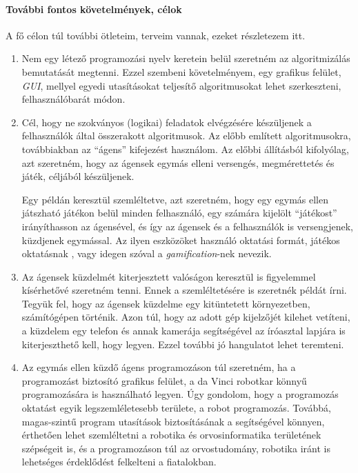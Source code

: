 \documentclass[12pt,a4paper,oneside]{report} %
\begin{document}
\paragraph*{További fontos követelmények, célok}
A fő célon túl további ötleteim, terveim vannak, ezeket részletezem itt.
\begin{enumerate}
	\item Nem egy létező programozási nyelv keretein belül szeretném  az algoritmizálás bemutatását megtenni. Ezzel szembeni követelményem, egy grafikus felület, \textit{GUI}, mellyel egyedi utasításokat teljesítő algoritmusokat lehet szerkeszteni, felhasználóbarát módon.
	\item Cél, hogy ne szokványos (logikai) feladatok elvégzésére készüljenek a felhasználók által összerakott algoritmusok. Az előbb említett algoritmusokra, továbbiakban az ``ágens'' kifejezést használom. Az előbbi állításból kifolyólag, azt szeretném, hogy az ágensek  egymás elleni versengés, megmérettetés és játék, céljából készüljenek.
	\par Egy példán keresztül szemléltetve, azt szeretném, hogy egy egymás ellen játszható játékon belül minden felhasználó, egy számára kijelölt ``játékost'' irányíthasson az ágensével, és így az ágensek és a felhasználók is versengjenek, küzdjenek egymással. Az ilyen eszközöket használó oktatási formát, játékos oktatásnak  \cite{riar2020game}, vagy idegen szóval a \textit{gamification}-nek \cite{Deterding2011} nevezik. 
	\item Az ágensek küzdelmét kiterjesztett valóságon keresztül is figyelemmel kísérhetővé szeretném tenni. Ennek a szemléltetésére is szeretnék példát írni. Tegyük fel, hogy  az ágensek küzdelme egy kitüntetett környezetben, számítógépen történik. Azon túl, hogy az adott gép kijelzőjét kilehet vetíteni, a küzdelem egy telefon és annak kamerája segítségével az íróasztal lapjára is kiterjeszthető kell, hogy legyen. Ezzel további jó hangulatot lehet teremteni.
	\item Az egymás ellen küzdő ágens programozáson túl szeretném, ha a programozást biztosító grafikus felület, a da Vinci robotkar könnyű programozására is használható legyen. Úgy gondolom, hogy a programozás oktatást egyik legszemléletesebb területe, a robot programozás. Továbbá, magas-szintű program utasítások biztosításának a segítségével könnyen, érthetően lehet szemléltetni a robotika és orvosinformatika területének szépségeit is, és a programozáson túl az orvostudomány, robotika iránt is  lehetséges érdeklődést felkelteni a fiatalokban.
\end{enumerate}
\end{document}
